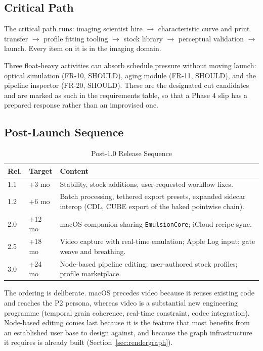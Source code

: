 \subsection{Critical Path}

The critical path runs: imaging scientist hire $\to$ characteristic curve and
print transfer $\to$ profile fitting tooling $\to$ stock library $\to$
perceptual validation $\to$ launch. Every item on it is in the imaging domain.

Three float-heavy activities can absorb schedule pressure without moving launch:
optical simulation (FR-10, SHOULD), aging module (FR-11, SHOULD), and the
pipeline inspector (FR-20, SHOULD). These are the designated cut candidates and
are marked as such in the requirements table, so that a Phase 4 slip has a
prepared response rather than an improvised one.

\subsection{Post-Launch Sequence}

\begin{table}[htbp]
\caption{Post-1.0 Release Sequence}
\label{tab:postlaunch}
\begin{center}
\renewcommand{\arraystretch}{1.15}
\begin{tabularx}{\columnwidth}{@{}ll>{\raggedright\arraybackslash}X@{}}
\toprule
\textbf{Rel.} & \textbf{Target} & \textbf{Content} \\
\midrule
1.1 & +3 mo & Stability, stock additions, user-requested workflow fixes. \\
1.2 & +6 mo & Batch processing, tethered export presets, expanded sidecar interop (CDL, CUBE export of the baked pointwise chain). \\
2.0 & +12 mo & macOS companion sharing \texttt{EmulsionCore}; iCloud recipe sync. \\
2.5 & +18 mo & Video capture with real-time emulation; Apple Log input; gate weave and breathing. \\
3.0 & +24 mo & Node-based pipeline editing; user-authored stock profiles; profile marketplace. \\
\bottomrule
\end{tabularx}
\end{center}
\end{table}

The ordering is deliberate. macOS precedes video because it reuses existing code
and reaches the P2 persona, whereas video is a substantial new engineering
programme (temporal grain coherence, real-time constraint, codec integration).
Node-based editing comes last because it is the feature that most benefits from
an established user base to design against, and because the graph infrastructure
it requires is already built (Section~\ref{sec:rendergraph}).
